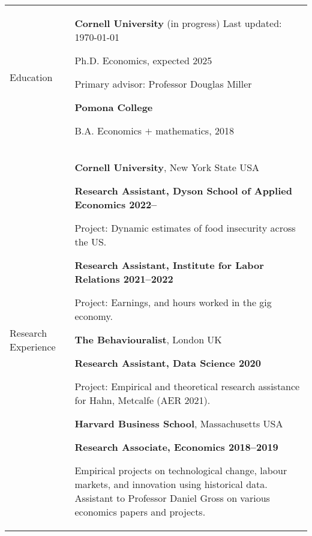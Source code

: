 \documentclass[letterpaper,11pt,oneside]{article}
\begin{document}
\noindent
\begin{tabular}[\textwidth]{p{} p{}}
    \Large{Education}
    & \textbf{Cornell University} (in progress)  \hfill Last updated: \today

    Ph.D. Economics, expected 2025 
    
    Primary advisor: Professor Douglas Miller \vspace{0.1cm}
    
    \textbf{Pomona College}

    B.A. Economics $+$ mathematics, 2018 \vspace{0.2cm} \\
    
    
    
\Large{Research Experience}
    & \textbf{Cornell University}, New York State USA
    
    \textbf{Research Assistant, Dyson School of Applied Economics 2022--}

    Project: Dynamic estimates of food insecurity across the US.
    
    \textbf{Research Assistant, Institute for Labor Relations 2021--2022}

    Project: Earnings, and hours worked in the gig economy.
    \vspace{0.2cm}
    
    \textbf{The Behaviouralist}, London UK
    
    \textbf{Research Assistant, Data Science 2020}
    
    Project: Empirical and theoretical research assistance for Hahn, Metcalfe (AER 2021).
    \vspace{0.2cm}

    \textbf{Harvard Business School}, Massachusetts USA
    
    \textbf{Research Associate, Economics 2018--2019}
    
    Empirical projects on technological change, labour markets, and innovation using historical data.
    Assistant to Professor Daniel Gross on various economics papers and projects.
    \vspace{0.2cm} \\


\end{tabular}
\end{document}
